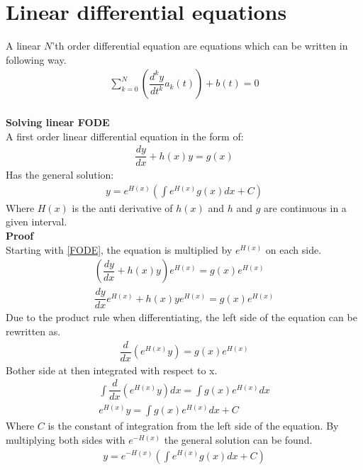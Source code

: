 \section{Linear differential equations}
A linear $N$'th order differential equation are equations which can be written in following way.
\begin{align*}
\sum_{k=0}^{N}\left(\dfrac{d^ky}{dt^k}a_k(t)\right)+b(t)=0
\end{align*}
\\
\textbf{Solving linear FODE}
\\
A first order linear differential equation in the form of:
\begin{align} \label{FODE}
\dfrac{dy}{dx}+h(x)y=g(x)
\end{align}
Has the general solution:
\begin{align}
y=e^{H(x)}\left(\int e^{H(x)}g(x)dx+C\right)
\end{align}
Where $H(x)$ is the anti derivative of $h(x)$ and $h$ and $g$ are continuous in a given interval.
\\
\textbf{Proof}
\\
Starting with \eqref{FODE}, the equation is multiplied by $e^{H(x)}$ on each side.
\begin{align*}
\left(\dfrac{dy}{dx}+h(x)y\right)e^{H(x)}=g(x)e^{H(x)}
\\
\dfrac{dy}{dx}e^{H(x)}+h(x)ye^{H(x)}=g(x)e^{H(x)}
\end{align*}
Due to the product rule when differentiating, the left side of the equation can be rewritten as.
\begin{align*}
\dfrac{d}{dx}\left(e^{H(x)}y\right)=g(x)e^{H(x)}
\end{align*}
Bother side at then integrated with respect to x.
\begin{align*}
\int\dfrac{d}{dx}\left(e^{H(x)}y\right)dx=\int g(x)e^{H(x)}dx
\\
e^{H(x)}y=\int g(x)e^{H(x)}dx+C
\end{align*}
Where $C$ is the constant of integration from the left side of the  equation. By multiplying both sides with $e^{-H(x)}$ the general solution can be found.
\begin{align}
y=e^{-H(x)}\left(\int e^{H(x)}g(x)dx+C\right)
\end{align}
